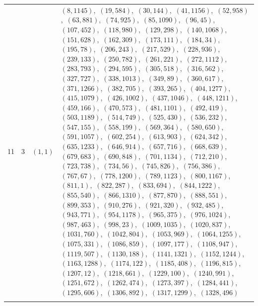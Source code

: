\documentclass[11pt]{article}
\begin{document}
\begin{longtable}{@{}rrl>{\raggedright\arraybackslash}p{}@{}}
11 & 3 & $(1,1)$ & $(8,1145)$,\allowbreak\ $(19,584)$,\allowbreak\ $(30,144)$,\allowbreak\ $(41,1156)$,\allowbreak\ $(52,958)$,\allowbreak\ $(63,881)$,\allowbreak\ $(74,925)$,\allowbreak\ $(85,1090)$,\allowbreak\ $(96,45)$,\allowbreak\ $(107,452)$,\allowbreak\ $(118,980)$,\allowbreak\ $(129,298)$,\allowbreak\ $(140,1068)$,\allowbreak\ $(151,628)$,\allowbreak\ $(162,309)$,\allowbreak\ $(173,111)$,\allowbreak\ $(184,34)$,\allowbreak\ $(195,78)$,\allowbreak\ $(206,243)$,\allowbreak\ $(217,529)$,\allowbreak\ $(228,936)$,\allowbreak\ $(239,133)$,\allowbreak\ $(250,782)$,\allowbreak\ $(261,221)$,\allowbreak\ $(272,1112)$,\allowbreak\ $(283,793)$,\allowbreak\ $(294,595)$,\allowbreak\ $(305,518)$,\allowbreak\ $(316,562)$,\allowbreak\ $(327,727)$,\allowbreak\ $(338,1013)$,\allowbreak\ $(349,89)$,\allowbreak\ $(360,617)$,\allowbreak\ $(371,1266)$,\allowbreak\ $(382,705)$,\allowbreak\ $(393,265)$,\allowbreak\ $(404,1277)$,\allowbreak\ $(415,1079)$,\allowbreak\ $(426,1002)$,\allowbreak\ $(437,1046)$,\allowbreak\ $(448,1211)$,\allowbreak\ $(459,166)$,\allowbreak\ $(470,573)$,\allowbreak\ $(481,1101)$,\allowbreak\ $(492,419)$,\allowbreak\ $(503,1189)$,\allowbreak\ $(514,749)$,\allowbreak\ $(525,430)$,\allowbreak\ $(536,232)$,\allowbreak\ $(547,155)$,\allowbreak\ $(558,199)$,\allowbreak\ $(569,364)$,\allowbreak\ $(580,650)$,\allowbreak\ $(591,1057)$,\allowbreak\ $(602,254)$,\allowbreak\ $(613,903)$,\allowbreak\ $(624,342)$,\allowbreak\ $(635,1233)$,\allowbreak\ $(646,914)$,\allowbreak\ $(657,716)$,\allowbreak\ $(668,639)$,\allowbreak\ $(679,683)$,\allowbreak\ $(690,848)$,\allowbreak\ $(701,1134)$,\allowbreak\ $(712,210)$,\allowbreak\ $(723,738)$,\allowbreak\ $(734,56)$,\allowbreak\ $(745,826)$,\allowbreak\ $(756,386)$,\allowbreak\ $(767,67)$,\allowbreak\ $(778,1200)$,\allowbreak\ $(789,1123)$,\allowbreak\ $(800,1167)$,\allowbreak\ $(811,1)$,\allowbreak\ $(822,287)$,\allowbreak\ $(833,694)$,\allowbreak\ $(844,1222)$,\allowbreak\ $(855,540)$,\allowbreak\ $(866,1310)$,\allowbreak\ $(877,870)$,\allowbreak\ $(888,551)$,\allowbreak\ $(899,353)$,\allowbreak\ $(910,276)$,\allowbreak\ $(921,320)$,\allowbreak\ $(932,485)$,\allowbreak\ $(943,771)$,\allowbreak\ $(954,1178)$,\allowbreak\ $(965,375)$,\allowbreak\ $(976,1024)$,\allowbreak\ $(987,463)$,\allowbreak\ $(998,23)$,\allowbreak\ $(1009,1035)$,\allowbreak\ $(1020,837)$,\allowbreak\ $(1031,760)$,\allowbreak\ $(1042,804)$,\allowbreak\ $(1053,969)$,\allowbreak\ $(1064,1255)$,\allowbreak\ $(1075,331)$,\allowbreak\ $(1086,859)$,\allowbreak\ $(1097,177)$,\allowbreak\ $(1108,947)$,\allowbreak\ $(1119,507)$,\allowbreak\ $(1130,188)$,\allowbreak\ $(1141,1321)$,\allowbreak\ $(1152,1244)$,\allowbreak\ $(1163,1288)$,\allowbreak\ $(1174,122)$,\allowbreak\ $(1185,408)$,\allowbreak\ $(1196,815)$,\allowbreak\ $(1207,12)$,\allowbreak\ $(1218,661)$,\allowbreak\ $(1229,100)$,\allowbreak\ $(1240,991)$,\allowbreak\ $(1251,672)$,\allowbreak\ $(1262,474)$,\allowbreak\ $(1273,397)$,\allowbreak\ $(1284,441)$,\allowbreak\ $(1295,606)$,\allowbreak\ $(1306,892)$,\allowbreak\ $(1317,1299)$,\allowbreak\ $(1328,496)$\\
\addlinespace[3pt]
\end{longtable}
\endgroup
\end{document}
